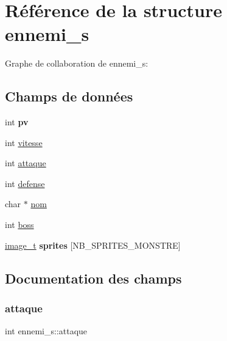 \hypertarget{structennemi__s}{}\section{Référence de la structure ennemi\+\_\+s}
\label{structennemi__s}


Graphe de collaboration de ennemi\+\_\+s\+:
\subsection*{Champs de données}
\begin{DoxyCompactItemize}
\item 
\mbox{\label{structennemi__s_acced51b66bf14056583ddbe794fcc2e3}} 
int {\bfseries pv}
\item 
int \hyperlink{structennemi__s_a2209ba506bbe6b6bfba8434837deba28}{vitesse}
\item 
int \hyperlink{structennemi__s_a1b3d60dde3acf89c6ba6ae2c250109e2}{attaque}
\item 
int \hyperlink{structennemi__s_a8e04831164889e636a03551f33167ac9}{defense}
\item 
char $\ast$ \hyperlink{structennemi__s_a0928cbeee6295b778f04976ef3bd7e03}{nom}
\item 
int \hyperlink{structennemi__s_a38a4d8c90aba3e83b1d13fbef1613e6a}{boss}
\item 
\mbox{\label{structennemi__s_ae92fa2affdd84cb74c340a78938ddeb4}} 
\hyperlink{structimage__t}{image\+\_\+t} {\bfseries sprites} \mbox{[}N\+B\+\_\+\+S\+P\+R\+I\+T\+E\+S\+\_\+\+M\+O\+N\+S\+T\+RE\mbox{]}
\end{DoxyCompactItemize}


\subsection{Documentation des champs}
\mbox{\label{structennemi__s_a1b3d60dde3acf89c6ba6ae2c250109e2}} 
\subsubsection{\texorpdfstring{attaque}{attaque}}
{\footnotesize\ttfamily int ennemi\+\_\+s\+::attaque}

